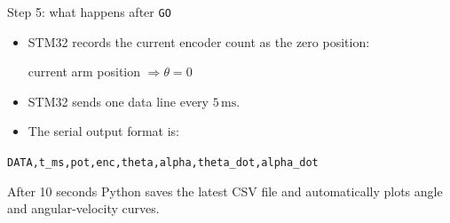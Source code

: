 \documentclass[aspectratio=169]{beamer}
\begin{document}
\begin{frame}{Step 5: what happens after \texttt{GO}}

\begin{itemize}
    \item STM32 records the current encoder count as the zero position:
    \vspace{0.15cm}

    \begin{center}
    current arm position $\Rightarrow \theta = 0$
    \end{center}

    \vspace{0.25cm}

    \item STM32 sends one data line every $5\,\mathrm{ms}$.
    \vspace{0.25cm}

    \item The serial output format is:
\end{itemize}

\vspace{0.15cm}

\begin{center}
\small
\texttt{DATA,t\_ms,pot,enc,theta,alpha,theta\_dot,alpha\_dot}
\end{center}

\vspace{0.25cm}

\begin{block}{After 10 seconds}
\small
Python saves the latest CSV file and automatically plots angle and angular-velocity curves.
\end{block}

\end{frame}
\end{document}
